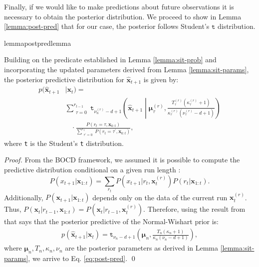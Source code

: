 \documentclass[Afour,sageh,times]{sagej}
\theoremstyle{lemma}
\begin{document}
Finally, if we would like to make predictions about future observations it is necessary to obtain the posterior distribution. We proceed to show in Lemma \ref{lemma:post-pred} that for our case, the posterior follows Student's $\mathtt{t}$ distribution.

\begin{restatable}{lemma}{postpredlemma} \label{lemma:post-pred}

Building on the predicate established in Lemma \ref{lemma:sit-prob} and incorporating the updated parameters derived from Lemma \ref{lemma:sit-params}, the posterior predictive distribution for $\boldsymbol{\hat{x}}_{t+1}$ is given by:
\vspace{-1mm}
    \begin{align} \label{eq:post-pred}
        p(\boldsymbol{\hat{x}}_{t+1} &| \boldsymbol{x}_{t}) = \nonumber \\ &\sum_{\substack{\tau = 0}}^{r_{t-1}} \mathtt{t}_{\nu_n^{(r)} - d + 1} \left( \boldsymbol{\hat{x}}_{t+1} \middle| \boldsymbol{\mu}_{\tau}^{(r)}, \frac{T_{\tau}^{(r)} (\kappa_{\tau}^{(r)} + 1)}{\kappa_{\tau}^{(r)} (\nu_{\tau}^{(r)} - d + 1)} \right) \nonumber \\ &~~~~\cdot \frac{P(r_t = \tau, \boldsymbol{x}_{0:t})}{\sum_{\substack{\tau^\prime=0}}^{r_t} P(r_t = \tau^\prime, \boldsymbol{x}_{0:t})},
    \end{align}
    where \texttt{t} is the Student's \texttt{t} distribution.
\end{restatable}

\begin{proof}

From the BOCD framework, we assumed it is possible to compute the predictive distribution conditional on a given run length \cite[]{adams2007bayesian}: $$P(x_{t+1} | \boldsymbol{x}_{1:t}) = \sum_{r_t} P(x_{t+1} | r_t, \boldsymbol{x}_t^{(r)}) P(r_t | \boldsymbol{x}_{1:t}).$$
Additionally, $P(\boldsymbol{x}_{t+1} | \boldsymbol{x}_{1:t})$ depends only on the data of the current run $\boldsymbol{x}_t^{(r)}$. Thus, $P(\boldsymbol{x}_t | r_{t-1}, \boldsymbol{x}_{1:t}) = P(\boldsymbol{x}_t | r_{t-1}, \boldsymbol{x}_t^{(r)})$. Therefore, using the result from \cite{murphy2007conjugateforms} that says that the posterior predictive of the Normal-Wishart prior is:
\begin{align*}
p(\boldsymbol{\hat{x}}_{t+1} | \boldsymbol{x}_t) = \mathtt{t}_{\nu_n - d + 1} \left( \boldsymbol{\mu}_n, \frac{T_n (\kappa_n + 1)}{\kappa_n (\nu_n - d + 1)} \right),
\end{align*} 
where $\boldsymbol{\mu}_n, T_n, \kappa_n, \nu_n$ are the posterior parameters as derived in Lemma \ref{lemma:sit-params}, we arrive to Eq. \eqref{eq:post-pred}. \qed

\end{proof}
\end{document}
